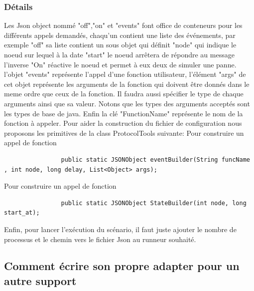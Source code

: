 \documentclass{article}
\begin{document}
			\subsubsection{Détails}
			Les Json object nommé "off","on" et "events" font office de conteneurs pour les différents appels demandés,
			chaqu'un contient une liste des événements, par exemple {\color{magenta} "off"} sa liste contient un sous objet qui définit
			\newline
			{\color{magenta} "node"} qui indique le noeud sur lequel à la date {\color{magenta} "start"} le noeud arrêtera de répondre au message
			l'inverse {\color{magenta} "On"} réactive le noeud et permet à eux deux de simuler une panne.
			\newline
			\newline
			l'objet {\color{magenta} "events"} représente l'appel d'une fonction utilisateur, l'élément {\color{magenta} "args"} de cet objet représente les arguments de la fonction qui
			doivent être donnés dans le meme ordre que ceux de la fonction. Il faudra aussi spécifier le type de chaque arguments ainsi que sa valeur.
			\newline
			Notons que les types des arguments acceptés sont les types de base de java.
			Enfin la clé {\color{magenta} "FunctionName"} représente le nom de la fonction à appeler.
			\newline
			\newline
			Pour aider la construction du fichier de configuration nous proposons les primitives de la class ProtocolTools suivante:
			\newline
			Pour construire un appel de fonction
			\begin{lstlisting}
				public static JSONObject eventBuilder(String funcName , int node, long delay, List<Object> args);
			\end{lstlisting}
			Pour construire un appel de fonction
			\begin{lstlisting}
				public static JSONObject StateBuilder(int node, long start_at);
			\end{lstlisting}

			Enfin, pour lancer l'exécution du scénario, il faut juste ajouter le nombre de processus et le chemin vers le fichier Json au runneur souhaité.
		\subsection{Comment écrire son propre adapter pour un autre support}

		\newpage
\end{document}
